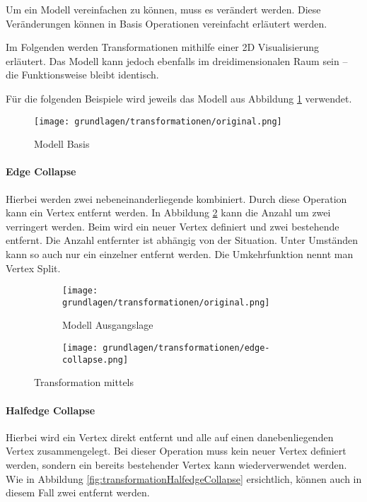 Um ein Modell vereinfachen zu können, muss es verändert werden.
Diese Veränderungen können in Basis Operationen vereinfacht erläutert werden.

Im Folgenden werden Transformationen mithilfe einer 2D Visualisierung erläutert. Das Modell kann jedoch ebenfalls im dreidimensionalen Raum sein – die Funktionsweise bleibt identisch.

Für die folgenden Beispiele wird jeweils das Modell aus Abbildung \ref{fig:transformationOriginal} verwendet.

\begin{figure}[H]
  \centering
  \texttt{[image: grundlagen/transformationen/original.png]}
  \caption{Modell Basis}
  \label{fig:transformationOriginal}
\end{figure}

\paragraph{Edge Collapse}
Hierbei werden zwei nebeneinanderliegende  kombiniert. Durch diese Operation kann ein Vertex entfernt werden. In Abbildung \ref{fig:transformationEdgeCollapse} kann die Anzahl  um zwei verringert werden. Beim  wird ein neuer Vertex definiert und zwei bestehende entfernt. Die Anzahl entfernter  ist abhängig von der Situation. Unter Umständen kann so auch nur ein einzelner  entfernt werden.
Die Umkehrfunktion nennt man Vertex Split.

\begin{figure}[H]
  \centering
  \begin{subfigure}{.5\textwidth}
    \centering
    \texttt{[image: grundlagen/transformationen/original.png]}
    \caption{Modell Ausgangslage}
  \end{subfigure}%
  \begin{subfigure}{.5\textwidth}
    \centering
    \texttt{[image: grundlagen/transformationen/edge-collapse.png]}
    \caption{}
  \end{subfigure}
  \caption{Transformation mittels }
  \label{fig:transformationEdgeCollapse}
\end{figure}

\paragraph{Halfedge Collapse}
Hierbei wird ein Vertex direkt entfernt und alle  auf einen danebenliegenden Vertex zusammengelegt. Bei dieser Operation muss kein neuer Vertex definiert werden, sondern ein bereits bestehender Vertex kann wiederverwendet werden. Wie in Abbildung \ref{fig:transformationHalfedgeCollapse} ersichtlich, können auch in diesem Fall zwei  entfernt werden.


